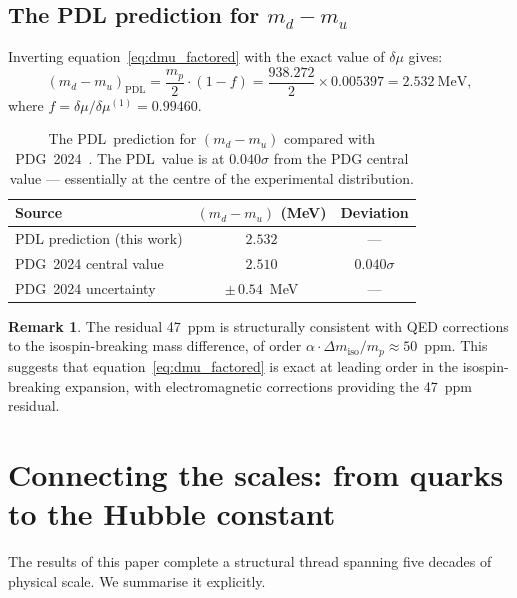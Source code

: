 \documentclass[11pt,a4paper]{article}
\theoremstyle{definition}
\newtheorem{remark}[theorem]{Remark}
\newcommand{\PDL}{\textnormal{PDL}}
\newcommand{\dmu}{\delta\mu}
\newcommand{\dmiso}{\Delta m_{\mathrm{iso}}}
\begin{document}
\subsection{The PDL prediction for \texorpdfstring{$m_d - m_u$}{md - mu}}
\label{subsec:prediction}

Inverting equation~\eqref{eq:dmu_factored} with the exact value of $\dmu$ gives:
\begin{equation}
\label{eq:prediction_iso}
(m_d - m_u)_{\mathrm{PDL}} = \frac{m_p}{2}\cdot(1 - f) = \frac{938.272}{2}\times 0.005397 = 2.532\ \mathrm{MeV},
\end{equation}
where $f = \dmu/\dmu^{(1)} = 0.99460$.

\begin{table}[ht]
\centering
\caption{The \PDL\ prediction for $(m_d-m_u)$ compared with PDG~2024~\cite{PDG_2024}. The \PDL\ value is at $0.040\sigma$ from the PDG central value --- essentially at the centre of the experimental distribution.}
\label{tab:iso_comparison}
\bigskip
\begin{tabular}{lcc}
\toprule
Source & $(m_d-m_u)$ (MeV) & Deviation \\
\midrule
PDL prediction (this work) & $2.532$ & --- \\
PDG~2024 central value & $2.510$ & $0.040\sigma$ \\
PDG~2024 uncertainty & $\pm\,0.54$~MeV & --- \\
\bottomrule
\end{tabular}
\end{table}

\begin{remark}
The residual 47~ppm is structurally consistent with QED corrections to the isospin-breaking mass difference, of order $\alpha\cdot\dmiso/m_p \approx 50$~ppm. This suggests that equation~\eqref{eq:dmu_factored} is exact at leading order in the isospin-breaking expansion, with electromagnetic corrections providing the 47~ppm residual.
\end{remark}

\section{Connecting the scales: from quarks to the Hubble constant}
\label{sec:scales}

The results of this paper complete a structural thread spanning five decades of physical scale. We summarise it explicitly.
\end{document}
